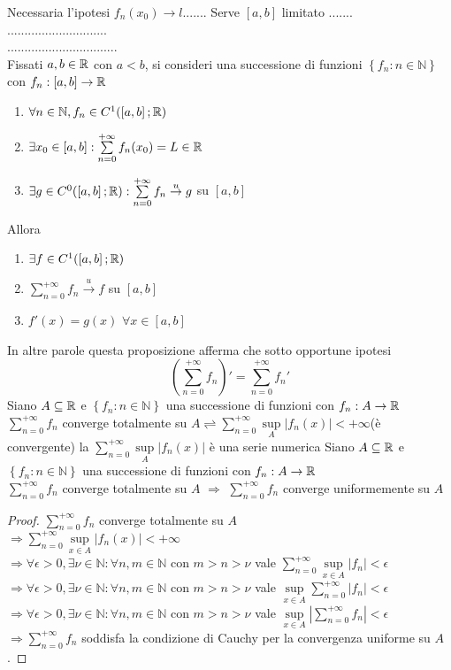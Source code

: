 \observation
Necessaria l'ipotesi $f_n(x_0)\to l$.......
\observation
Serve $\left[a,b\right]$ limitato .......\\
.............................\\
................................\\
\proposition
Fissati $a,b\in \mathbb{R}$ con $a<b$, si consideri una successione di funzioni $\left\{f_n:n\in\mathbb{N}\right\}$ con $f_n:\left[a,b\right]\to \mathbb{R}$
\begin{enumerate}
	\item $\forall n\in\mathbb{N}, f_n\in C^1(\left[a,b\right]; \mathbb{R})$
	\item $\exists x_0\in\left[a,b\right]: \sum\limits_{n=0}^{+\infty}f_n(x_0)=L\in \mathbb{R}$
	\item $\exists g \in C^0(\left[a,b\right]; \mathbb{R}): \sum\limits_{n=0}^{+\infty}f_n\overset{u}{\to}g$ su $\left[a,b\right]$
\end{enumerate}
Allora
\begin{enumerate}
	\item $\exists f\in C^1(\left[a,b\right]; \mathbb{R})$
	\item $\sum\limits_{n=0}^{+\infty}f_n\overset{u}{\to}f$ su $\left[a,b\right]$
	\item $f'(x)=g(x)$ $\forall x\in\left[a,b\right]$
\end{enumerate}
\observation
In altre parole questa proposizione afferma che sotto opportune ipotesi
$$\left(\sum\limits_{n=0}^{+\infty} f_n \right)' =  \sum\limits_{n=0}^{+\infty}f_n'$$
Siano $A\subseteq  \mathbb{R}$ e $\left\{f_n:n\in\mathbb{N}\right\}$ una successione di funzioni con $f_n:A\to \mathbb{R}$\\
$\sum\limits_{n=0}^{+\infty}f_n$ converge totalmente su $A \rightleftharpoons \sum\limits_{n=0}^{+\infty}\sup\limits_{A}\left|f_n(x)\right|<+\infty$(è convergente) 
\observation
la $\sum\limits_{n=0}^{+\infty}\sup\limits_{A}\left|f_n(x)\right|$ è una serie numerica
\proposition
Siano $A\subseteq \mathbb{R}$ e $\left\{f_n:n\in\mathbb{N}\right\}$ una successione di funzioni con $f_n:A\to \mathbb{R}$\\
$\sum\limits_{n=0}^{+\infty}f_n$ converge totalmente su $A$ $\Rightarrow$  $\sum\limits_{n=0}^{+\infty}f_n$ converge uniformemente su $A$
\begin{proof}
	$\sum\limits_{n=0}^{+\infty}f_n$ converge totalmente su $A$\\
	$\Rightarrow \sum\limits_{n=0}^{+\infty}\sup\limits_{x\in A}\left|f_n(x)\right|<+\infty$\\
	$\Rightarrow \forall\epsilon>0, \exists\nu\in\mathbb{N}: \forall n,m\in\mathbb{N}$ con $m>n>\nu$ vale $\sum\limits_{n=0}^{+\infty}\sup\limits_{x\in A}\left|f_n\right|<\epsilon$\\
	$\Rightarrow \forall\epsilon>0, \exists\nu\in\mathbb{N}: \forall n,m\in\mathbb{N}$ con $m>n>\nu$ vale $\sup\limits_{x\in A}\sum\limits_{n=0}^{+\infty}\left|f_n\right|<\epsilon$\\
	$\Rightarrow \forall\epsilon>0, \exists\nu\in\mathbb{N}: \forall n,m\in\mathbb{N}$ con $m>n>\nu$ vale $\sup\limits_{x\in A}\left|\sum\limits_{n=0}^{+\infty}f_n\right|<\epsilon$\\
	$\Rightarrow \sum\limits_{n=0}^{+\infty}f_n$ soddisfa la condizione di Cauchy per la convergenza uniforme su $A$.
\end{proof}
